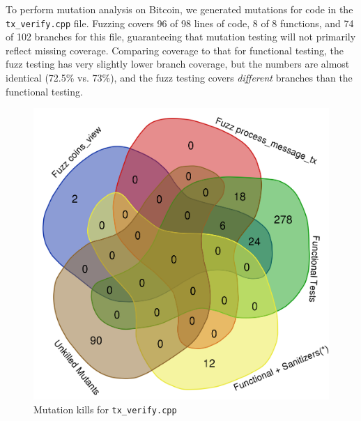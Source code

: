\begin{sloppypar}

To perform mutation analysis on Bitcoin, we generated mutations for code in the
{\tt tx\_verify.cpp} file.  Fuzzing covers 96 of 98 lines of code, 8
of 8 functions, and 74 of 102 branches for this file, guaranteeing
that mutation testing will not primarily reflect missing coverage.
Comparing coverage to that for functional testing, the fuzz testing
has very slightly lower branch coverage, but the numbers are almost
identical (72.5\% vs. 73\%), and the fuzz testing covers \emph{different} branches than
the functional testing.  

\begin{figure}
\vspace{2mm}
\includegraphics[width=0.9\columnwidth]{kill_pre_valgrind.png}
\caption{Mutation kills for {\tt tx\_verify.cpp}}
\label{kills}
\end{figure}







\end{sloppypar}
